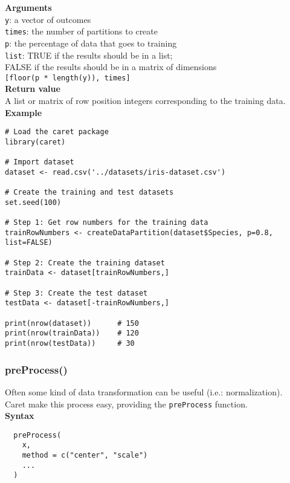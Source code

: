 \documentclass{article}
\begin{document}
\textbf{Arguments}\\

\texttt{y}: a vector of outcomes\\
\texttt{times}: the number of partitions to create\\
\texttt{p}: the percentage of data that goes to training\\
\texttt{list}: TRUE if the results should be in a list;\\
\phantom{.........} FALSE if the results should be in a matrix of dimensions\\
\phantom{.........} \texttt{[floor(p * length(y)), times]}\\

\textbf{Return value}\\

A list or matrix of row position integers corresponding to the training data.\\

\textbf{Example}\\
\begin{lstlisting}
# Load the caret package
library(caret)

# Import dataset
dataset <- read.csv('../datasets/iris-dataset.csv')

# Create the training and test datasets
set.seed(100)

# Step 1: Get row numbers for the training data
trainRowNumbers <- createDataPartition(dataset$Species, p=0.8, list=FALSE)

# Step 2: Create the training dataset
trainData <- dataset[trainRowNumbers,]

# Step 3: Create the test dataset
testData <- dataset[-trainRowNumbers,]

print(nrow(dataset))      # 150
print(nrow(trainData))    # 120
print(nrow(testData))     # 30
\end{lstlisting}

\subsubsection{preProcess()}
Often some kind of data transformation can be useful (i.e.: normalization).\\
Caret make this process easy, providing the \texttt{preProcess} function.\\

\textbf{Syntax}
\begin{verbatim}
  preProcess(
    x,
    method = c("center", "scale")
    ...
  )
\end{verbatim}
\end{document}
